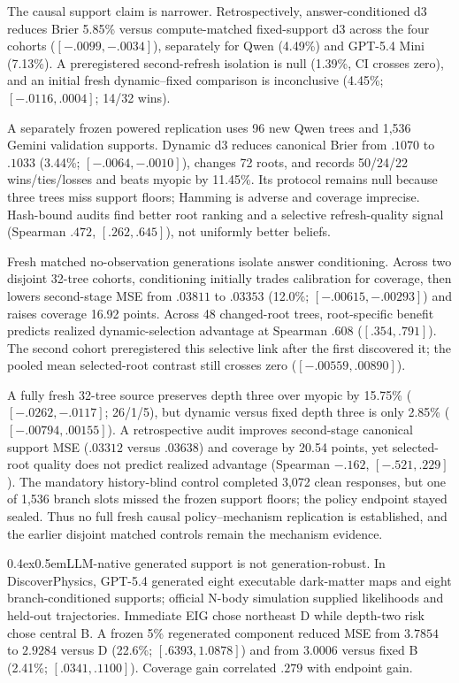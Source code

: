 \documentclass[10pt]{article}
\makeatletter
\renewcommand\paragraph{\@startsection{paragraph}{4}{0pt}%
  {0.4ex}{0.5em}{\normalfont\normalsize\bfseries}}
\makeatother
\begin{document}
{{The causal support claim is narrower. Retrospectively, answer-conditioned d3
reduces Brier 5.85\% versus compute-matched fixed-support d3 across the four
cohorts ($[-.0099,-.0034]$), separately for Qwen (4.49\%) and GPT-5.4 Mini
(7.13\%). A preregistered second-refresh isolation is null (1.39\%, CI crosses
zero), and an initial fresh dynamic--fixed comparison is inconclusive
(4.45\%; $[-.0116,.0004]$; 14/32 wins).

A separately frozen powered replication uses 96 new Qwen trees and 1,536
Gemini validation supports. Dynamic d3 reduces canonical Brier from $.1070$
to $.1033$ (3.44\%; $[-.0064,-.0010]$), changes 72 roots, and records
50/24/22 wins/ties/losses and beats myopic by 11.45\%. Its protocol remains
null because three trees miss support floors; Hamming is adverse and coverage
imprecise. Hash-bound audits find better root ranking and a selective
refresh-quality signal (Spearman $.472$, $[.262,.645]$), not uniformly better
beliefs.

Fresh matched no-observation generations isolate answer conditioning. Across
two disjoint 32-tree cohorts, conditioning initially trades calibration for
coverage, then lowers second-stage MSE from $.03811$ to $.03353$ (12.0\%;
$[-.00615,-.00293]$) and raises coverage 16.92 points. Across 48 changed-root
trees, root-specific benefit predicts realized dynamic-selection advantage at
Spearman $.608$ ($[.354,.791]$). The second cohort preregistered this selective
link after the first discovered it; the pooled mean selected-root contrast
still crosses zero ($[-.00559,.00890]$).

A fully fresh 32-tree source preserves depth three over myopic by 15.75\%
($[-.0262,-.0117]$; 26/1/5), but dynamic versus fixed depth three is only
2.85\% ($[-.00794,.00155]$). A retrospective audit improves second-stage
canonical support MSE ($.03312$ versus $.03638$) and coverage by 20.54 points,
yet selected-root quality does not predict realized advantage (Spearman
$-.162$, $[-.521,.229]$). The mandatory history-blind control completed 3,072
clean responses, but one of 1,536 branch slots missed the frozen support floors;
the policy endpoint stayed sealed. Thus no full fresh causal policy--mechanism
replication is established, and the earlier disjoint matched controls remain
the mechanism evidence.
}

}

\paragraph{LLM-native generated support is not generation-robust.}
In DiscoverPhysics, GPT-5.4 generated eight executable dark-matter maps and
eight branch-conditioned supports; official N-body simulation supplied
likelihoods and held-out trajectories. Immediate EIG chose northeast D while
depth-two risk chose central B. A frozen 5\% regenerated component reduced MSE
from $3.7854$ to $2.9284$ versus D (22.6\%; $[.6393,1.0878]$) and from $3.0006$
versus fixed B (2.41\%; $[.0341,.1100]$). Coverage gain correlated $.279$ with
endpoint gain.
\end{document}
